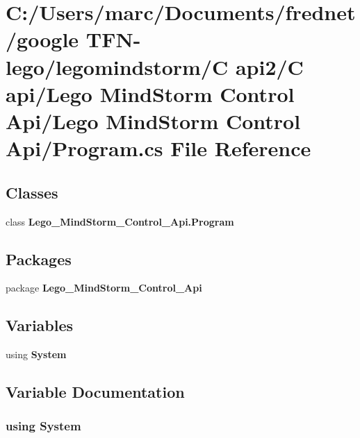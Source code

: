 \section{C:/Users/marc/Documents/frednet/google TFN-lego/legomindstorm/C api2/C api/Lego MindStorm Control Api/Lego MindStorm Control Api/Program.cs File Reference}
\label{_program_8cs}
\subsection*{Classes}
\begin{CompactItemize}
\item 
class \textbf{Lego\_\-MindStorm\_\-Control\_\-Api.Program}
\end{CompactItemize}
\subsection*{Packages}
\begin{CompactItemize}
\item 
package {\bf Lego\_\-MindStorm\_\-Control\_\-Api}
\end{CompactItemize}
\subsection*{Variables}
\begin{CompactItemize}
\item 
﻿using {\bf System}
\end{CompactItemize}


\subsection{Variable Documentation}
\subsubsection[{System}]{\setlength{\rightskip}{0pt plus 5cm}﻿using {\bf System}}\label{_program_8cs_81a223a02c34d82b47199f08308847f2}


